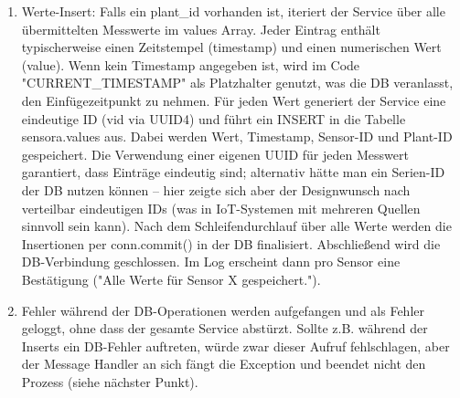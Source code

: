 \begin{enumerate}
\begin{enumerate}
\begin{enumerate}
            \item Werte-Insert: Falls ein plant\_id vorhanden ist, iteriert der Service über alle übermittelten Messwerte im values Array. Jeder Eintrag enthält typischerweise einen Zeitstempel (timestamp) und einen numerischen Wert (value). Wenn kein Timestamp angegeben ist, wird im Code\\ "CURRENT\_TIMESTAMP" als Platzhalter genutzt, was die DB veranlasst, den Einfügezeitpunkt zu nehmen. Für jeden Wert generiert der Service eine eindeutige ID (vid via UUID4) und führt ein INSERT in die Tabelle sensora.values aus. Dabei werden Wert, Timestamp, Sensor-ID und Plant-ID gespeichert. Die Verwendung einer eigenen UUID für jeden Messwert garantiert, dass Einträge eindeutig sind; alternativ hätte man ein Serien-ID der DB nutzen können – hier zeigte sich aber der Designwunsch nach verteilbar eindeutigen IDs (was in IoT-Systemen mit mehreren Quellen sinnvoll sein kann). Nach dem Schleifendurchlauf über alle Werte werden die Insertionen per conn.commit() in der DB finalisiert. Abschließend wird die DB-Verbindung geschlossen. Im Log erscheint dann pro Sensor eine Bestätigung ("Alle Werte für Sensor X gespeichert.").
            \item Fehler während der DB-Operationen werden aufgefangen und als Fehler geloggt, ohne dass der gesamte Service abstürzt. Sollte z.B. während der Inserts ein DB-Fehler auftreten, würde zwar dieser Aufruf fehlschlagen, aber der Message Handler an sich fängt die Exception und beendet nicht den Prozess (siehe nächster Punkt).
        \end{enumerate}

\end{enumerate}
\end{enumerate}
